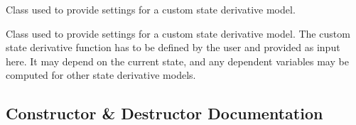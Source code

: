 Class used to provide settings for a custom state derivative model. 

Class used to provide settings for a custom state derivative model. The custom state derivative function has to be defined by the user and provided as input here. It may depend on the current state, and any dependent variables may be computed for other state derivative models. 

\subsection{Constructor \& Destructor Documentation}
